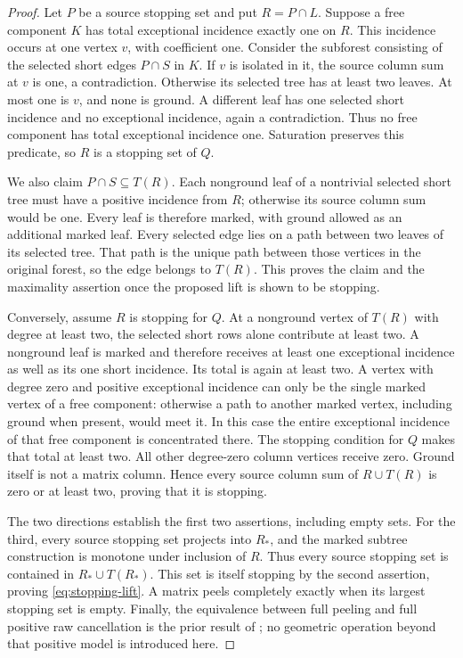 \begin{proof}
Let $P$ be a source stopping set and put $R=P\cap L$. Suppose a free
component $K$ has total exceptional incidence exactly one on $R$. This
incidence occurs at one vertex $v$, with coefficient one. Consider the
subforest consisting of the selected short edges $P\cap S$ in $K$. If
$v$ is isolated in it, the source column sum at $v$ is one, a
contradiction. Otherwise its selected tree has at least two leaves. At
most one is $v$, and none is ground. A different leaf has one selected
short incidence and no exceptional incidence, again a contradiction.
Thus no free component has total exceptional incidence one. Saturation
preserves this predicate, so $R$ is a stopping set of $Q$.

We also claim $P\cap S\subseteq T(R)$. Each nonground leaf of a
nontrivial selected short tree must have a positive incidence from $R$;
otherwise its source column sum would be one. Every leaf is therefore
marked, with ground allowed as an additional marked leaf. Every selected
edge lies on a path between two leaves of its selected tree. That path
is the unique path between those vertices in the original forest, so the
edge belongs to $T(R)$. This proves the claim and the maximality assertion
once the proposed lift is shown to be stopping.

Conversely, assume $R$ is stopping for $Q$. At a nonground vertex of
$T(R)$ with degree at least two, the selected short rows alone contribute
at least two. A nonground leaf is marked and therefore receives at least
one exceptional incidence as well as its one short incidence. Its total
is again at least two. A vertex with degree zero and positive exceptional
incidence can only be the single marked vertex of a free component:
otherwise a path to another marked vertex, including ground when present,
would meet it. In this case the entire exceptional incidence of that free
component is concentrated there. The stopping condition for $Q$ makes
that total at least two. All other degree-zero column vertices receive
zero. Ground itself is not a matrix column. Hence every source column
sum of $R\cup T(R)$ is zero or at least two, proving that it is stopping.

The two directions establish the first two assertions, including empty
sets. For the third, every source stopping set projects into $R_*$, and
the marked subtree construction is monotone under inclusion of $R$.
Thus every source stopping set is contained in $R_*\cup T(R_*)$.
This set is itself stopping by the second assertion, proving
\eqref{eq:stopping-lift}. A matrix peels completely exactly when its
largest stopping set is empty. Finally, the equivalence between full
peeling and full positive raw cancellation is the prior result of
\cite{incoming-stopping}; no geometric operation beyond that positive
model is introduced here.
\end{proof}

